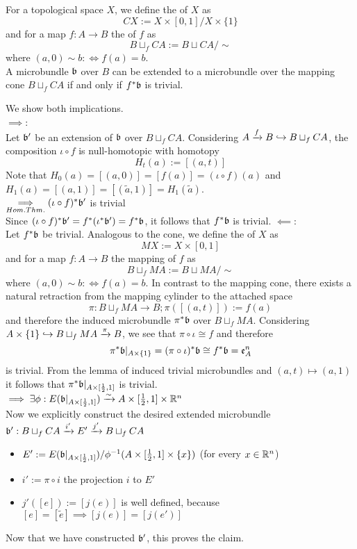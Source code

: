 For a topological space $X$, we define the  of $X$ as 
\[ CX := X \times [0, 1] / X \times \{1\} \]
and for a map $f: A \to B$ the  of $f$ as
\[ B \sqcup_f CA := B \sqcup CA / \sim \]
where $(a, 0) \sim b :\iff f(a) = b$.
 \\
A microbundle $\bb$ over $B$ can be extended to a microbundle over the mapping cone $B \sqcup_f CA$ if and only if $f^*\bb$ is trivial.
\begin{myproof}
We show both implications. \\
$\implies$: \\
Let $\bb'$ be an extension of $\bb$ over $B \sqcup_f CA$.
Considering $A \xto{f} B \incl B \sqcup_f CA$, the composition $\iota \circ f$ is null-homotopic with homotopy
\[ H_t(a) := [(a, t)] \]
Note that $H_0(a) = [(a, 0)] = [f(a)] = (\iota \circ f)(a)$ and $H_1(a) = [(a, 1)] = [(\tilde{a}, 1)] = H_1(\tilde{a})$.
\\ $\ximplies{Hom. Thm.} (\iota \circ f)^*\bb'$ is trivial \\
Since $(\iota \circ f)^*\bb' = f^*(\iota^*\bb') = f^*\bb$, it follows that $f^*\bb$ is trivial.
$\impliedby$: \\
Let $f^*\bb$ be trivial.
Analogous to the cone, we define the  of $X$ as
\[ MX := X \times [0, 1] \]
and for a map $f: A \to B$ the mapping  of $f$ as
\[ B \sqcup_f MA := B \sqcup MA / \sim \]
where $(a, 0) \sim b :\iff f(a) = b$.
In contrast to the mapping cone, there exists a natural retraction from the mapping cylinder to the attached space
\[ \pi: B \sqcup_f MA \to B; \pi([(a, t)]) := f(a) \]
and therefore the induced microbundle $\pi^*\bb$ over $B \sqcup_f MA$.
Considering $A \times \{1\} \incl B \sqcup_f MA \xto{\pi} B$, we see that $\pi \circ \iota \cong f$ and therefore
\[ \pi^*\bb\restr{A \times \{1\}} = (\pi \circ \iota)^*\bb \cong f^*\bb = \mathfrak{e}^n_A\]
is trivial. From the lemma of induced trivial microbundles and $(a, t) \mapsto (a, 1)$ it follows that $\pi^*\bb\restr{A \times [\frac{1}{2}, 1]}$ is trivial.
\\ $\implies \exists \phi: E(\bb\restr{A \times [\frac{1}{2}, 1]}) \isomto A \times [\frac{1}{2}, 1] \times \R^n$ \\
Now we explicitly construct the desired extended microbundle $\bundledef{\bb'}{B \sqcup_f CA}{E'}{i'}{j'}$
\begin{itemize}
    \item $E' := E(\bb\restr{A \times [\frac{1}{2}, 1]}) / \phi^{-1}(A \times [\frac{1}{2}, 1] \times \{x\})$ (for every $x \in \R^n$)
    \item $i' := \pi \circ i$ the projection $i$ to $E'$
    \item $j'([e]) := [j(e)]$ is well defined, because $[e] = [\tilde{e}] \implies [j(e)] = [j(e')]$
\end{itemize}
Now that we have constructed $\bb'$, this proves the claim.
\end{myproof}